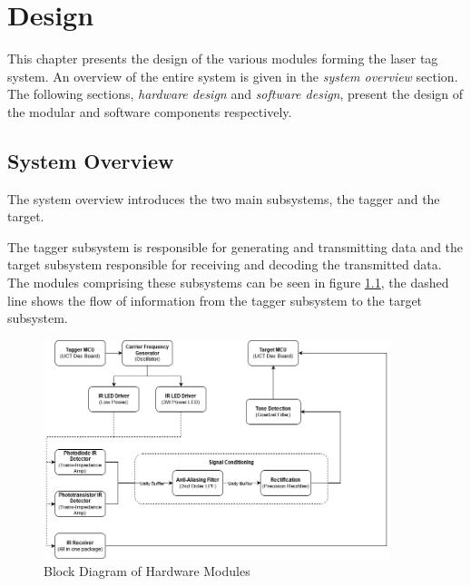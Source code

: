 \chapter{Design}
\label{ch_design}

This chapter presents the design of the various modules forming the laser tag system. An overview of the entire system is given in the \textit{system overview} section. The following sections, \textit{hardware design} and \textit{software design}, present the design of the modular and software components respectively.


\section{System Overview}
The system overview introduces the two main subsystems, the tagger and the target.

The tagger subsystem is responsible for generating and transmitting data and the target subsystem responsible for receiving and decoding the transmitted data. The modules comprising these subsystems can be seen in figure \ref{fig:system_overview_hardware}, the dashed line shows the flow of information from the tagger subsystem to the target subsystem.

\begin{figure}[H]
	\centering
	\includegraphics[width=0.9\textwidth]{figures/design/system_overview_hardware}
	\caption{Block Diagram of Hardware Modules}
	\label{fig:system_overview_hardware}
\end{figure}

